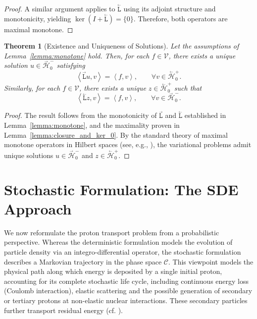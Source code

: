 \documentclass{amsart}
\newcommand{\fL}{\stackrel{_\rightarrow}{\mathtt L}}
\newcommand{\bL}{\stackrel{_\leftarrow}{\mathtt L}}
\theoremstyle{plain}
\newtheorem{theorem}{Theorem}[section]
\newcommand{\ltwop}[2]{\ensuremath{\!\left\langle{#1,#2}\right\rangle}}
\newcommand{\cH}{\stackrel{_\rightarrow}{\mathscr H}}
\newcommand{\cbH}{\stackrel{_\leftarrow}{\mathscr H}}
\newcommand{\cV}{\ensuremath{\mathscr V}}
\begin{document}
\begin{proof}
A similar argument applies to $\bL$ using its adjoint structure and
monotonicity, yielding $\operatorname{ker}(I + \bL) =
\{0\}$. Therefore, both operators are maximal monotone.
\end{proof}

\begin{theorem}[Existence and Uniqueness of Solutions]
  \label{thm:forward_exist_unique}
  Let the assumptions of Lemma~\ref{lemma:monotone} hold. Then, for each
  $f \in \cV$, there exists a unique solution $u \in \cH_0^-$
  satisfying
  \begin{equation}
    \ltwop{\fL u}{v} = \ltwop{f}{v}, \qquad \forall v \in \cbH_0^+.
  \end{equation}
  Similarly, for each $f \in \cV$, there exists a unique $z \in \cbH_0^+$ such that
  \begin{equation}
    \ltwop{\bL z}{v} = \ltwop{f}{v}, \qquad \forall v \in \cH_0^-.
  \end{equation}
\end{theorem}

\begin{proof}
  The result follows from the monotonicity of $\fL$ and $\bL$
  established in Lemma~\ref{lemma:monotone}, and the maximality proven
  in Lemma~\ref{lemma:closure_and_ker_0}. By the standard theory of
  maximal monotone operators in Hilbert spaces (see, e.g.,
  \cite[§6.3]{Ern_Guermond_1}), the variational problems admit unique
  solutions $u \in \cH_0^-$ and $z \in \cbH_0^+$.
\end{proof}

\section{Stochastic Formulation: The SDE Approach}
\label{sec:stochastic}

We now reformulate the proton transport problem from a probabilistic
perspective. Whereas the deterministic formulation models the
evolution of particle density via an integro-differential operator,
the stochastic formulation describes a Markovian trajectory in the
phase space $\mathcal{C}$. This viewpoint models the physical path
along which energy is deposited by a single initial proton, accounting
for its complete stochastic life cycle, including continuous energy
loss (Coulomb interaction), elastic scattering and the possible
generation of secondary or tertiary protons at non-elastic nuclear
interactions. These secondary particles further transport residual
energy (cf. \cite{smith2025stochastic}).
\end{document}
